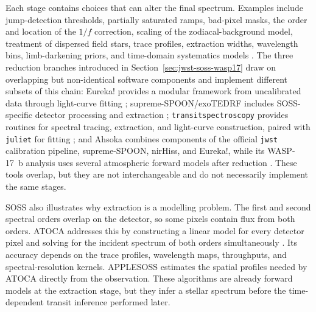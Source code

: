 Each stage contains choices that can alter the final spectrum. Examples include
jump-detection thresholds, partially saturated ramps, bad-pixel masks, the
order and location of the $1/f$ correction, scaling of the zodiacal-background
model, treatment of dispersed field stars, trace profiles, extraction widths,
wavelength bins, limb-darkening priors, and time-domain systematics models
\citep{RadicaEtAl2023,HolmbergMadhusudhan2023,LouieEtAl2025}. The three
reduction branches introduced in Section~\ref{sec:jwst-soss-wasp17} draw on
overlapping but non-identical software components and implement different
subsets of this chain: Eureka! provides a modular framework from uncalibrated
data through light-curve fitting \citep{BellEtAl2022}; supreme-SPOON/exoTEDRF
includes SOSS-specific detector processing and extraction
\citep{RadicaEtAl2023,Radica2024}; \texttt{transitspectroscopy} provides
routines for spectral tracing, extraction, and light-curve construction,
paired with \texttt{juliet} for fitting
\citep{Espinoza2022TransitSpectroscopy,EspinozaEtAl2019}; and Ahsoka combines
components of the official \texttt{jwst} calibration pipeline, supreme-SPOON,
nirHiss, and Eureka!, while its WASP-17~b analysis uses several atmospheric
forward models after reduction \citep{LouieEtAl2025}. These tools overlap, but
they are not interchangeable and do not necessarily implement the same stages.


SOSS also illustrates why extraction is a modelling problem. The first and
second spectral orders overlap on the detector, so some pixels contain flux
from both orders. ATOCA addresses this by constructing a linear model for every
detector pixel and solving for the incident spectrum of both orders
simultaneously \citep{DarveauBernierEtAl2022}. Its accuracy depends on the trace
profiles, wavelength maps, throughputs, and spectral-resolution kernels.
APPLESOSS \citep{RadicaEtAl2022} estimates the spatial profiles needed by ATOCA
directly from the observation. These algorithms are already forward models
at the extraction stage, but they infer a stellar spectrum before the
time-dependent transit inference performed later.


